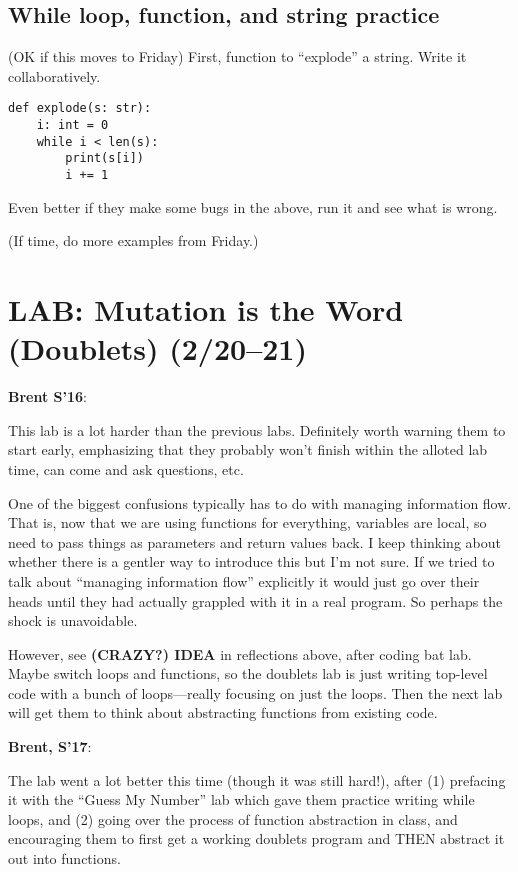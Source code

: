 \documentclass{article}
\newenvironment{reflect}[1]
{
  \noindent
  \begin{lrbox}{\reflectbox}
    \begin{minipage}[t]{\textwidth}
      \textbf{#1}:
}{
    \end{minipage}
  \end{lrbox}
  \fbox{\usebox{\reflectbox}}
}
\newcommand{\ready}{\textcolor{Green}{\Checkmark}\xspace}
\begin{document}
\subsection*{While loop, function, and string practice}

(OK if this moves to Friday) First, function to ``explode'' a string.
Write it collaboratively.

\begin{verbatim}
def explode(s: str):
    i: int = 0
    while i < len(s):
        print(s[i])
        i += 1
\end{verbatim}

Even better if they make some bugs in the above, run it and see what
is wrong.

(If time, do more examples from Friday.)

\newpage
\section*{\ready LAB: Mutation is the Word (Doublets) (2/20--21)}


\begin{reflect}{Brent S'16}
  This lab is a lot harder than the previous labs.  Definitely worth
  warning them to start early, emphasizing that they probably won't
  finish within the alloted lab time, can come and ask questions, etc.

  One of the biggest confusions typically has to do with managing
  information flow.  That is, now that we are using functions for
  everything, variables are local, so need to pass things as
  parameters and return values back.  I keep thinking about whether
  there is a gentler way to introduce this but I'm not sure.  If we
  tried to talk about ``managing information flow'' explicitly it
  would just go over their heads until they had actually grappled with
  it in a real program.  So perhaps the shock is unavoidable.

  However, see \textbf{(CRAZY?) IDEA} in reflections above, after
  coding bat lab.  Maybe switch loops and functions, so the doublets
  lab is just writing top-level code with a bunch of loops---really
  focusing on just the loops.  Then the next lab will get them to
  think about abstracting functions from existing code.
\end{reflect}

\begin{reflect}{Brent, S'17}
  The lab went a lot better this time (though it was still hard!),
  after (1) prefacing it with the ``Guess My Number'' lab which gave
  them practice writing while loops, and (2) going over the process of
  function abstraction in class, and encouraging them to first get a
  working doublets program and THEN abstract it out into functions.
\end{reflect}
\end{document}
